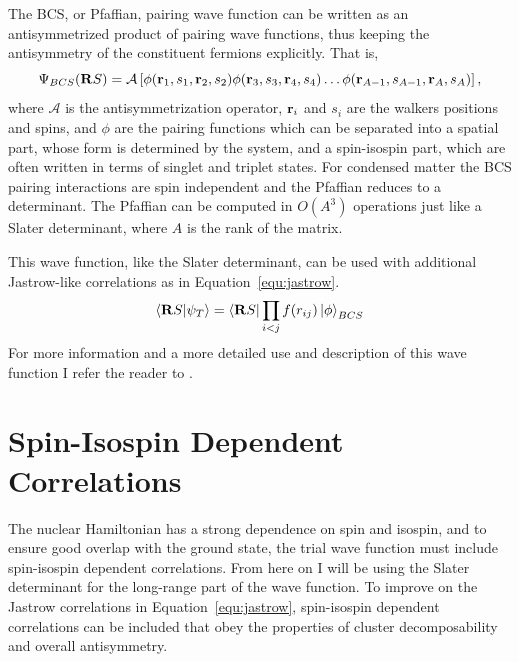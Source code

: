 The BCS, or Pfaffian, pairing wave function can be written as an antisymmetrized product of pairing wave functions, thus keeping the antisymmetry of the constituent fermions explicitly. That is,
\begin{equation}
   \Psi_{BCS}(\mathbf{R} S) = \mathcal{A}\left[\phi(\mathbf{r}_1,s_1,\mathbf{r}_2,s_2)\phi(\mathbf{r}_3,s_3,\mathbf{r}_4,s_4)\ldots\phi(\mathbf{r}_{A-1},s_{A-1},\mathbf{r}_A,s_A)\right],
\end{equation}
where $\mathcal{A}$ is the antisymmetrization operator, $\mathbf{r}_i$ and $s_i$ are the walkers positions and spins, and $\phi$ are the pairing functions which can be separated into a spatial part, whose form is determined by the system, and a spin-isospin part, which are often written in terms of singlet and triplet states. For condensed matter the BCS pairing interactions are spin independent and the Pfaffian reduces to a determinant. The Pfaffian can be computed in $O(A^3)$ operations just like a Slater determinant, where $A$ is the rank of the matrix.

This wave function, like the Slater determinant, can be used with additional Jastrow-like correlations as in Equation~\ref{equ:jastrow}.
\begin{equation}
   \left< \mathbf{R} S | \psi_T \right> = \left< \mathbf{R} S \right|\prod\limits_{i<j}f(r_{ij}) \left| \phi \right>_{BCS}
\end{equation}
For more information and a more detailed use and description of this wave function I refer the reader to \cite{bajdich2006,bajdich2008}.

\section{Spin-Isospin Dependent Correlations}
The nuclear Hamiltonian has a strong dependence on spin and isospin, and to ensure good overlap with the ground state, the trial wave function must include spin-isospin dependent correlations. From here on I will be using the Slater determinant for the long-range part of the wave function. To improve on the Jastrow correlations in Equation~\ref{equ:jastrow}, spin-isospin dependent correlations can be included that obey the properties of cluster decomposability and overall antisymmetry.


